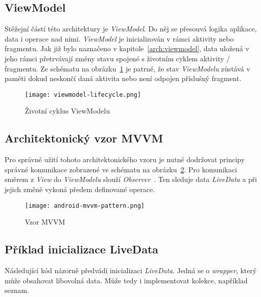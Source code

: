         \subsection{ViewModel}
        Stěžejní částí této architektury je \emph{ViewModel}. Do něj se přesouvá logika aplikace, data i operace nad nimi. \emph{ViewModel} je inicializován v rámci aktivity nebo fragmentu. Jak již bylo naznačeno v kapitole~\ref{arch:viewmodel}, data uložená v jeho rámci přetrvávají změny stavu spojené s životním cyklem aktivity / fragmentu. Ze schématu na obrázku~\ref{diagram:viewmodel_lifecycle} je patrné, že stav \emph{ViewModelu} zůstává v paměti dokud neskončí daná aktivita nebo není odpojen příslušný fragment.

        \begin{figure}[h!]
            \centering
            \texttt{[image: viewmodel-lifecycle.png]}
            \caption[Životní cyklus ViewModelu]{Životní cyklus ViewModelu\cite{viewmodel-lifecycle}}
            \label{diagram:viewmodel_lifecycle}
        \end{figure}

        \newpage
        \subsection{Architektonický vzor MVVM}
        Pro správné užití tohoto architektonického vzoru je nutné dodržovat principy správné komunikace zobrazené ve schématu na obrázku~\ref{diagram:mvvm_pattern}. Pro komunikaci směrem z \emph{View} do \emph{ViewModelu} slouží \emph{Observer}~\cite{livedata}. Ten sleduje data \emph{LiveData} a při jejich změně vykoná předem definované operace.

        \begin{figure}[h!]
            \centering
            \texttt{[image: android-mvvm-pattern.png]}
            \caption[Vzor MVVM]{Vzor MVVM~\cite{mvvm-pattern}}
            \label{diagram:mvvm_pattern}
        \end{figure}

        \subsection{Příklad inicializace LiveData}
        Následující kód názorně předvádí inicializaci \emph{LiveData}. Jedná se o \emph{wrapper}, který může obsahovat libovolná data. Může tedy i implementovat kolekce, například seznam.

